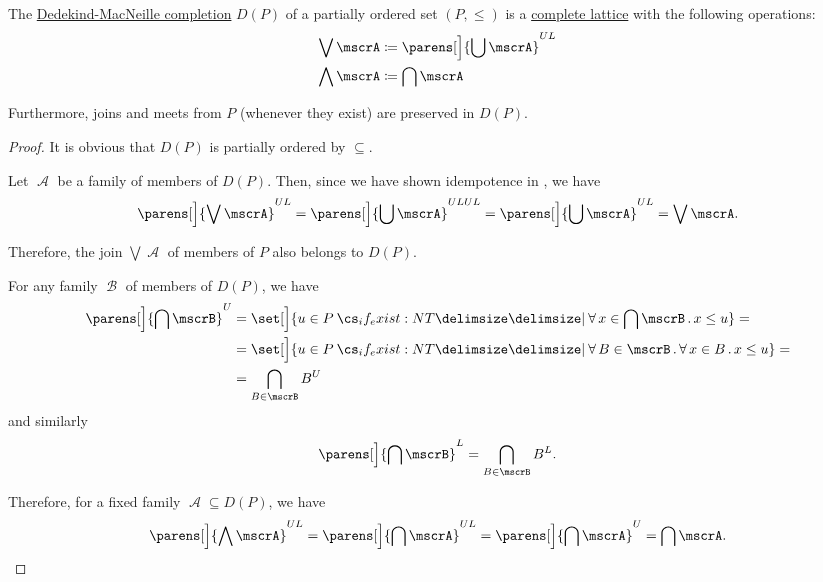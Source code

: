 \begin{theorem}\label{thm:def:dedekind_macnielle_completion}
  The \hyperref[def:dedekind_macnielle_completion]{Dedekind-MacNeille completion} \( D(P) \) of a partially ordered set \( (P, \leq) \) is a \hyperref[def:semilattice/lattice]{complete lattice} with the following operations:
  \begin{align*}
    \bigvee \mscrA   &\coloneqq \parens[\Big]{ \bigcup \mscrA }^{UL} \\
    \bigwedge \mscrA &\coloneqq \bigcap \mscrA
  \end{align*}

  Furthermore, joins and meets from \( P \) (whenever they exist) are preserved in \( D(P) \).
\end{theorem}
\begin{proof}
  It is obvious that \( D(P) \) is partially ordered by \( \subseteq \).

   Let \( \mscrA \) be a family of members of \( D(P) \). Then, since we have shown idempotence in , we have
  \begin{equation*}
    \parens[\Big]{ \bigvee \mscrA }^{UL}
    =
    \parens[\Big]{ \bigcup \mscrA }^{ULUL}
    =
    \parens[\Big]{ \bigcup \mscrA }^{UL}
    =
    \bigvee \mscrA.
  \end{equation*}

  Therefore, the join \( \bigvee \mscrA \) of members of \( P \) also belongs to \( D(P) \).

   For any family \( \mscrB \) of members of \( D(P) \), we have
  \begin{align*}
    \parens[\Big]{ \bigcap \mscrB }^U
    &=
    \set[\Big]{ u \in P \given* \qforall {x \in \bigcap \mscrB} x \leq u }
    = \\ &=
    \set[\Big]{ u \in P \given* \qforall {B \in \mscrB} \qforall {x \in B} x \leq u }
    = \\ &=
    \bigcap_{B \in \mscrB} B^U
  \end{align*}
  and similarly
  \begin{equation*}
    \parens[\Big]{ \bigcap \mscrB }^L
    =
    \bigcap_{B \in \mscrB} B^L.
  \end{equation*}

  Therefore, for a fixed family \( \mscrA \subseteq D(P) \), we have
  \begin{equation*}
    \parens[\Big]{ \bigwedge \mscrA }^{UL}
    =
    \parens[\Big]{ \bigcap \mscrA }^{UL}
    =
    \parens[\Big]{ \bigcap \mscrA }^U
    =
    \bigcap \mscrA.
  \end{equation*}


\end{proof}
